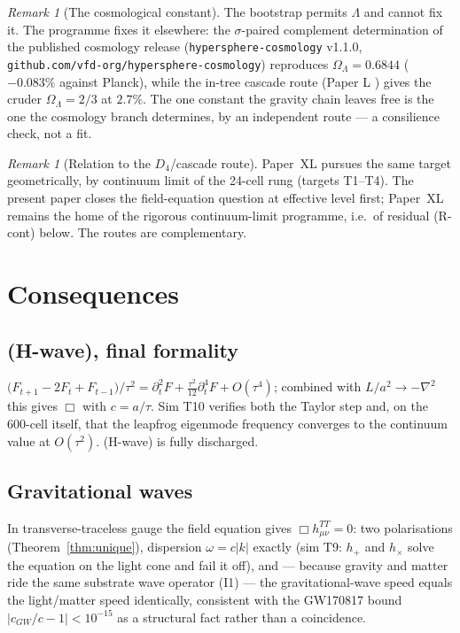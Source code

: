 \documentclass[12pt]{article}
\theoremstyle{definition}
\theoremstyle{remark}
\newtheorem{remark}[theorem]{Remark}
\begin{document}
\begin{remark}[The cosmological constant]\label{rem:lambda}
The bootstrap permits $\Lambda$ and cannot fix it. The programme fixes it elsewhere: the $\sigma$-paired complement determination of the published cosmology release (\texttt{hypersphere-cosmology} v1.1.0, \texttt{github.com/vfd-org/hypersphere-cosmology}) reproduces $\Omega_\Lambda = 0.6844$ ($-0.083\%$ against Planck), while the in-tree cascade route (Paper L \citep{SmartL}) gives the cruder $\Omega_\Lambda = 2/3$ at $2.7\%$. The one constant the gravity chain leaves free is the one the cosmology branch determines, by an independent route --- a consilience check, not a fit.
\end{remark}

\begin{remark}[Relation to the $D_4$/cascade route]
Paper~XL \citep{SmartXL} pursues the same target geometrically, by continuum limit of the 24-cell rung (targets T1--T4). The present paper closes the field-equation question at effective level first; Paper~XL remains the home of the rigorous continuum-limit programme, i.e.\ of residual (R-cont) below. The routes are complementary.
\end{remark}

\section{Consequences}\label{sec:consequences}

\subsection{(H-wave), final formality}\label{sec:hwave}
$\big(F_{t+1} - 2F_t + F_{t-1}\big)/\tau^2 = \partial_t^2 F + \tfrac{\tau^2}{12}\partial_t^4 F + O(\tau^4)$; combined with $L/a^2 \to -\nabla^2$ this gives $\Box$ with $c = a/\tau$. Sim T10 verifies both the Taylor step and, on the 600-cell itself, that the leapfrog eigenmode frequency converges to the continuum value at $O(\tau^2)$. (H-wave) is fully discharged.

\subsection{Gravitational waves}
In transverse-traceless gauge the field equation gives $\Box h^{TT}_{\mu\nu} = 0$: two polarisations (Theorem~\ref{thm:unique}), dispersion $\omega = c|k|$ exactly (sim T9: $h_+$ and $h_\times$ solve the equation on the light cone and fail it off), and --- because gravity and matter ride the same substrate wave operator (I1) --- the gravitational-wave speed equals the light/matter speed identically, consistent with the GW170817 bound $|c_{GW}/c - 1| < 10^{-15}$ \citep{GW170817} as a structural fact rather than a coincidence.
\end{document}
